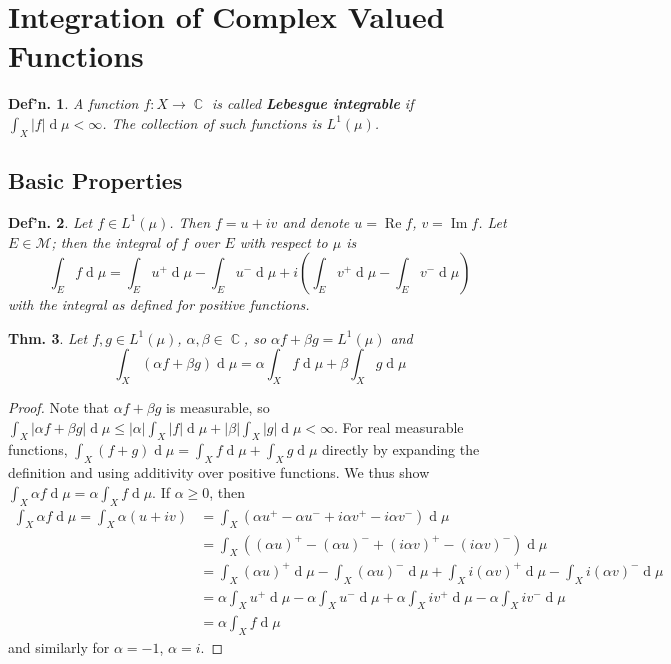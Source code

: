 \documentclass[12pt, a4paper]{book}
\DeclareMathOperator{\C}{\mathbb{C}}
\DeclareMathOperator{\re}{Re}
\DeclareMathOperator{\im}{Im}
\renewcommand{\d}[1]{\ensuremath{\operatorname{d}\!{#1}}} %
\newtheorem{theorem}{Thm.}[section]
\newtheorem{definition}[theorem]{Def'n.}
\theoremstyle{nonumberplain}
\newtheorem{proof}{Proof}
\begin{document}
\section{Integration of Complex Valued Functions}
\begin{definition}
    A function $f:X\to\C$ is called \textbf{Lebesgue integrable} if $\int_X|f|\d{\mu}<\infty$.
    The collection of such functions is $L^1(\mu)$.
\end{definition}
\subsection{Basic Properties}
\begin{definition}
    Let $f\in L^1(\mu)$.
    Then $f=u+iv$ and denote $u=\re f$, $v=\im f$.
    Let $E\in\mathcal{M}$; then the integral of $f$ over $E$ with respect to $\mu$ is
    \[\int_Ef\d{\mu}=\int_Eu^+\d{\mu}-\int_E u^-\d{\mu}+i\left(\int_E v^+\d{\mu}-\int_E v^-\d{\mu}\right)\]
    with the integral as defined for positive functions.
\end{definition}
\begin{theorem}
    Let $f,g\in L^1(\mu)$, $\alpha,\beta\in\C$, so $\alpha f+\beta g=L^1(\mu)$ and
    \[\int_X(\alpha f+\beta g)\d{\mu}=\alpha\int_X f\d{\mu}+\beta\int_X g\d{\mu}\]
\end{theorem}
\begin{proof}
    Note that $\alpha f+\beta g$ is measurable, so $\int_X|\alpha f+\beta g|\d{\mu}\leq |\alpha|\int_X|f|\d{\mu}+|\beta|\int_X|g|\d{\mu}<\infty$.
    For real measurable functions, $\int_X(f+g)\d{\mu}=\int_X f\d{\mu}+\int_X g\d{\mu}$ directly by expanding the definition and using additivity over positive functions.
    We thus show $\int_X\alpha f\d{\mu}=\alpha\int_Xf\d{\mu}$.
    If $\alpha\geq 0$, then
    \begin{align*}
        \int_X\alpha f\d{\mu}=\int_X\alpha(u+iv)&=\int_X(\alpha u^+-\alpha u^-+i\alpha v^+-i\alpha v^-)\d{\mu}\\
                                                &=\int_X((\alpha u)^+-(\alpha u)^-+(i\alpha v)^+-(i\alpha v)^-)\d{\mu}\\
                                                &=\int_X(\alpha u)^+\d{\mu}-\int_X(\alpha u)^-\d{\mu}+\int_Xi(\alpha v)^+\d{\mu}-\int_Xi(\alpha v)^-\d{\mu}\\
                                                &=\alpha\int_Xu^+\d{\mu}-\alpha\int_Xu^-\d{\mu}+\alpha\int_Xiv^+\d{\mu}-\alpha\int_Xiv^-\d{\mu}\\
                                                &= \alpha\int_X f\d{\mu}
    \end{align*}
    and similarly for $\alpha=-1$, $\alpha=i$.
\end{proof}
\end{document}
